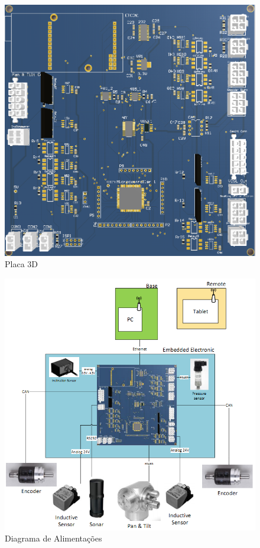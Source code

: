 \begin{figure}[H]
    \centering
    \includegraphics[width=1\columnwidth]{figs/eletronica/1.png}
    \caption{Placa 3D}
    \label{placa}
\end{figure}

\begin{figure}[H]
    \centering
    \includegraphics[width=1\columnwidth]{figs/eletronica/2.png}
    \caption{Diagrama de Alimentações}
    \label{alimentacao_placa}
\end{figure}

